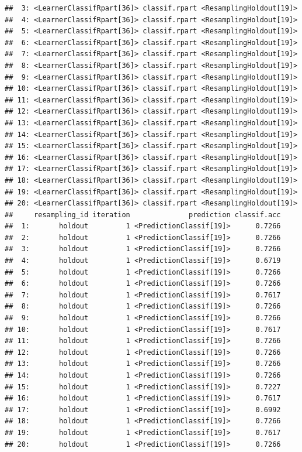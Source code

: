 \documentclass[
]{scrbook}
\begin{document}
\begin{verbatim}
##  3: <LearnerClassifRpart[36]> classif.rpart <ResamplingHoldout[19]>
##  4: <LearnerClassifRpart[36]> classif.rpart <ResamplingHoldout[19]>
##  5: <LearnerClassifRpart[36]> classif.rpart <ResamplingHoldout[19]>
##  6: <LearnerClassifRpart[36]> classif.rpart <ResamplingHoldout[19]>
##  7: <LearnerClassifRpart[36]> classif.rpart <ResamplingHoldout[19]>
##  8: <LearnerClassifRpart[36]> classif.rpart <ResamplingHoldout[19]>
##  9: <LearnerClassifRpart[36]> classif.rpart <ResamplingHoldout[19]>
## 10: <LearnerClassifRpart[36]> classif.rpart <ResamplingHoldout[19]>
## 11: <LearnerClassifRpart[36]> classif.rpart <ResamplingHoldout[19]>
## 12: <LearnerClassifRpart[36]> classif.rpart <ResamplingHoldout[19]>
## 13: <LearnerClassifRpart[36]> classif.rpart <ResamplingHoldout[19]>
## 14: <LearnerClassifRpart[36]> classif.rpart <ResamplingHoldout[19]>
## 15: <LearnerClassifRpart[36]> classif.rpart <ResamplingHoldout[19]>
## 16: <LearnerClassifRpart[36]> classif.rpart <ResamplingHoldout[19]>
## 17: <LearnerClassifRpart[36]> classif.rpart <ResamplingHoldout[19]>
## 18: <LearnerClassifRpart[36]> classif.rpart <ResamplingHoldout[19]>
## 19: <LearnerClassifRpart[36]> classif.rpart <ResamplingHoldout[19]>
## 20: <LearnerClassifRpart[36]> classif.rpart <ResamplingHoldout[19]>
##     resampling_id iteration              prediction classif.acc
##  1:       holdout         1 <PredictionClassif[19]>      0.7266
##  2:       holdout         1 <PredictionClassif[19]>      0.7266
##  3:       holdout         1 <PredictionClassif[19]>      0.7266
##  4:       holdout         1 <PredictionClassif[19]>      0.6719
##  5:       holdout         1 <PredictionClassif[19]>      0.7266
##  6:       holdout         1 <PredictionClassif[19]>      0.7266
##  7:       holdout         1 <PredictionClassif[19]>      0.7617
##  8:       holdout         1 <PredictionClassif[19]>      0.7266
##  9:       holdout         1 <PredictionClassif[19]>      0.7266
## 10:       holdout         1 <PredictionClassif[19]>      0.7617
## 11:       holdout         1 <PredictionClassif[19]>      0.7266
## 12:       holdout         1 <PredictionClassif[19]>      0.7266
## 13:       holdout         1 <PredictionClassif[19]>      0.7266
## 14:       holdout         1 <PredictionClassif[19]>      0.7266
## 15:       holdout         1 <PredictionClassif[19]>      0.7227
## 16:       holdout         1 <PredictionClassif[19]>      0.7617
## 17:       holdout         1 <PredictionClassif[19]>      0.6992
## 18:       holdout         1 <PredictionClassif[19]>      0.7266
## 19:       holdout         1 <PredictionClassif[19]>      0.7617
## 20:       holdout         1 <PredictionClassif[19]>      0.7266
\end{verbatim}
\end{document}
